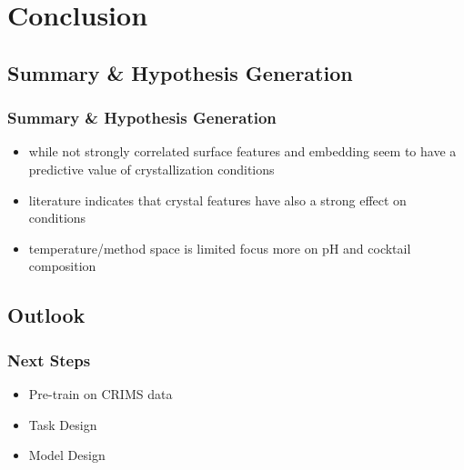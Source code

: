 
\section{Conclusion}
\subsection{Summary \& Hypothesis Generation}
\begin{frame}
	\frametitle{Summary \& Hypothesis Generation}
	\begin{itemize}
		\item while not strongly correlated surface features and embedding seem to have a predictive value of crystallization conditions
		\item literature indicates that crystal features have also a strong effect on conditions
		\item temperature/method space is limited focus more on pH and cocktail composition
	\end{itemize}
\end{frame}

\subsection{Outlook}
\begin{frame}
	\frametitle{Next Steps}
	\begin{itemize}
		\item Pre-train on CRIMS data 
		\item Task Design 
		\item Model Design 
	\end{itemize}
\end{frame}

